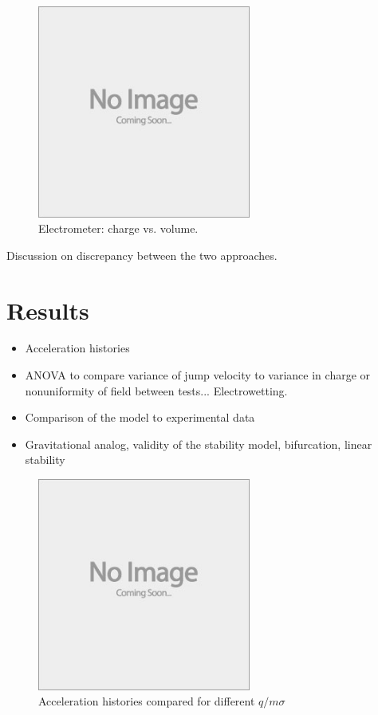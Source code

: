 \documentclass{jfm}
\begin{document}
\begin{figure}
  \centerline{\includegraphics[height=7cm,width=7cm]{e88_1_thumb.jpg}}
  \caption{Electrometer: charge vs. volume.}
\label{fig:electrometer}
\end{figure}

Discussion on discrepancy between the two approaches. \citep{magarvey_experimental_1962}

\section{Results}
\begin{itemize}
\item Acceleration histories
\item ANOVA to compare variance of jump velocity to variance in charge or nonuniformity of field between tests... Electrowetting.
\item Comparison of the model to experimental data
\item Gravitational analog, validity of the stability model, bifurcation, linear stability
\end{itemize}

\begin{figure}
  \centerline{\includegraphics[height=7cm,width=7cm]{e88_1_thumb.jpg}}
  \caption{Acceleration histories compared for different $q/m\sigma$}
\label{fig:acceleration}
\end{figure}
\end{document}
